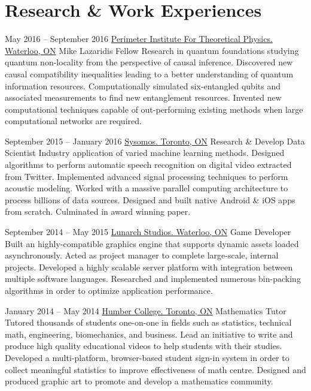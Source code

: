 \documentclass{article}
\begin{document}
    \section{Research \& Work Experiences}
    \begin{experiencelist}
        \item{
            May 2016 -- September 2016
        }{
            \href{www.perimeterinstitute.ca}{Perimeter Institute For Theoretical Physics. Waterloo, ON}
        }{
            Mike Lazaridis Fellow
        }{
            Research in quantum foundations studying quantum non-locality from the perspective of causal inference. Discovered new causal compatibility inequalities leading to a better understanding of quantum information resources. Computationally simulated six-entangled qubits and associated measurements to find new entanglement resources. Invented new computational techniques capable of out-performing existing methods when large computational networks are required.
        }

        \item{
            September 2015 -- January 2016
            }{
                \href{www.sysomos.com}{Sysomos. Toronto, ON}
            }{
                Research \& Develop Data Scientist
            }{
                Industry application of varied machine learning methods. Designed algorithms to perform automatic speech recognition on digital video extracted from Twitter. Implemented advanced signal processing techniques to perform acoustic modeling. Worked with a massive parallel computing architecture to process billions of data sources. Designed and built native Android \& iOS apps from scratch. Culminated in award winning paper.
            }

        \item{
            September 2014 -- May 2015
            }{
                \href{www.lunarchstudios.com}{Lunarch Studios. Waterloo, ON}
            }{
                Game Developer
            }{
                Built an highly-compatible graphics engine that supports dynamic assets loaded asynchronously. Acted as project manager to complete large-scale, internal projects. Developed a highly scalable server platform with integration between multiple software languages. Researched and implemented numerous bin-packing algorithms in order to optimize application performance.
            }

        \item{
            January 2014 -- May 2014
            }{
                \href{www.humber.ca}{Humber College. Toronto, ON}
            }{
                Mathematics Tutor
            }{
                Tutored thousands of students one-on-one in fields such as statistics, technical math, engineering, biomechanics, and business. Lead an initiative to write and produce high quality educational videos to help students with their studies. Developed a multi-platform, browser-based student sign-in system in order to collect meaningful statistics to improve effectiveness of math centre. Designed and produced graphic art to promote and develop a mathematics community.
            }


\end{experiencelist}
\end{document}
